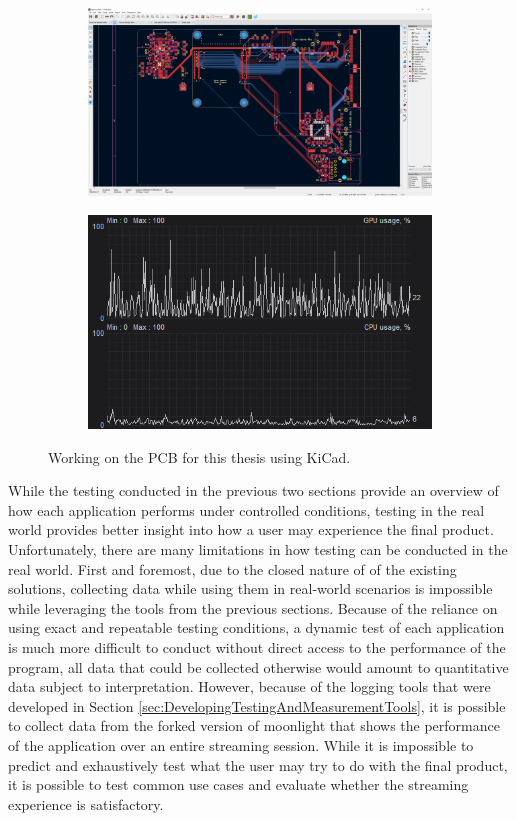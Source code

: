 \begin{figure}[!b]
  \centering
  \begin{subfigure}{1\textwidth}
    \centering
    \includegraphics[width=.9\linewidth]{Figures/realworld/kicad}
  \end{subfigure}
  \begin{subfigure}{1\textwidth}
    \centering
    \includegraphics[width=.5\linewidth]{Figures/realworld/kicadstats}
  \end{subfigure}
  \caption[Streaming Electronics Design software]{Working on the PCB for this thesis using KiCad.}
  \label{fig:RealWorldKicad}
\end{figure}

While the testing conducted in the previous two sections provide an overview of how each application performs under controlled conditions, testing in the real world provides better insight into how a user may experience the final product.
Unfortunately, there are many limitations in how testing can be conducted in the real world.
First and foremost, due to the closed nature of of the existing solutions, collecting data while using them in real-world scenarios is impossible while leveraging the tools from the previous sections.
Because of the reliance on using exact and repeatable testing conditions, a dynamic test of each application is much more difficult to conduct without direct access to the performance of the program, all data that could be collected otherwise would amount to quantitative data subject to interpretation.
However, because of the logging tools that were developed in Section \ref{sec:DevelopingTestingAndMeasurementTools}, it is possible to collect data from the forked version of moonlight that shows the performance of the application over an entire streaming session.
While it is impossible to predict and exhaustively test what the user may try to do with the final product, it is possible to test common use cases and evaluate whether the streaming experience is satisfactory.

